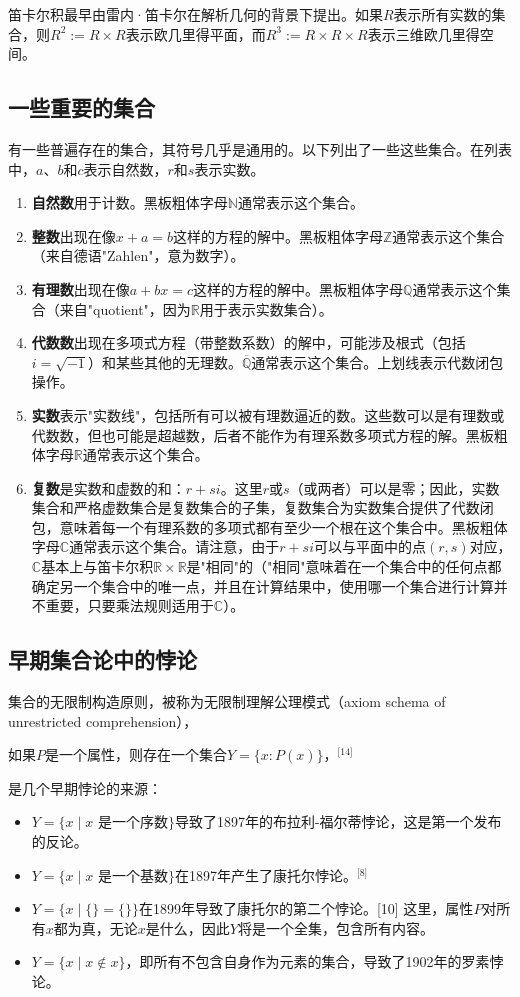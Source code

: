 笛卡尔积最早由雷内·笛卡尔在解析几何的背景下提出。如果$R$表示所有实数的集合，则$R^2 := R \times R$表示欧几里得平面，而$R^3 := R \times R \times R$表示三维欧几里得空间。
\subsection{一些重要的集合}  
有一些普遍存在的集合，其符号几乎是通用的。以下列出了一些这些集合。在列表中，$a$、$b$和$c$表示自然数，$r$和$s$表示实数。
\begin{enumerate}
\item \textbf{自然数}用于计数。黑板粗体字母$ \mathbb{N} $通常表示这个集合。
\item \textbf{整数}出现在像$x + a = b$这样的方程的解中。黑板粗体字母$ \mathbb{Z} $通常表示这个集合（来自德语"Zahlen"，意为数字）。
\item \textbf{有理数}出现在像$a + bx = c$这样的方程的解中。黑板粗体字母$ \mathbb{Q} $通常表示这个集合（来自"quotient"，因为$ \mathbb{R} $用于表示实数集合）。
\item \textbf{代数数}出现在多项式方程（带整数系数）的解中，可能涉及根式（包括$i = \sqrt{-1}$）和某些其他的无理数。$ \overline{\mathbb{Q}} $通常表示这个集合。上划线表示代数闭包操作。
\item \textbf{实数}表示"实数线"，包括所有可以被有理数逼近的数。这些数可以是有理数或代数数，但也可能是超越数，后者不能作为有理系数多项式方程的解。黑板粗体字母$ \mathbb{R} $通常表示这个集合。
\item \textbf{复数}是实数和虚数的和：$r + si$。这里$r$或$s$（或两者）可以是零；因此，实数集合和严格虚数集合是复数集合的子集，复数集合为实数集合提供了代数闭包，意味着每一个有理系数的多项式都有至少一个根在这个集合中。黑板粗体字母$ \mathbb{C} $通常表示这个集合。请注意，由于$ r + si $可以与平面中的点$(r, s)$对应，$ \mathbb{C} $基本上与笛卡尔积$ \mathbb{R} \times \mathbb{R} $是"相同"的（"相同"意味着在一个集合中的任何点都确定另一个集合中的唯一点，并且在计算结果中，使用哪一个集合进行计算并不重要，只要乘法规则适用于$ \mathbb{C} $）。
\end{enumerate}
\subsection{早期集合论中的悖论}  
集合的无限制构造原则，被称为无限制理解公理模式（axiom schema of unrestricted comprehension），

如果$P$是一个属性，则存在一个集合$Y = \{x : P(x)\}$，\(^\text{[14]}\) 

是几个早期悖论的来源：
\begin{itemize}
\item $Y = \{x \mid x \text{ 是一个序数}\}$导致了1897年的布拉利-福尔蒂悖论，这是第一个发布的反论。
\item $Y = \{x \mid x \text{ 是一个基数}\}$在1897年产生了康托尔悖论。\(^\text{[8]}\)
\item $Y = \{x \mid \{\} = \{\}\}$在1899年导致了康托尔的第二个悖论。[10] 这里，属性$P$对所有$x$都为真，无论$x$是什么，因此$Y$将是一个全集，包含所有内容。
\item $Y = \{x \mid x \notin x\}$，即所有不包含自身作为元素的集合，导致了1902年的罗素悖论。
\end{itemize}

